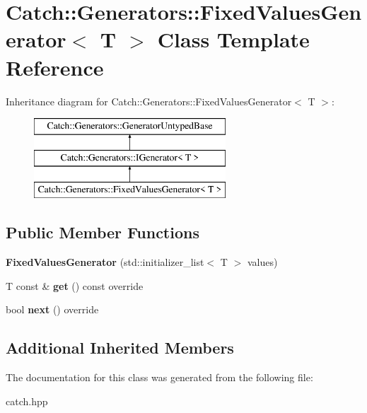 \hypertarget{classCatch_1_1Generators_1_1FixedValuesGenerator}{}\section{Catch\+::Generators\+::Fixed\+Values\+Generator$<$ T $>$ Class Template Reference}
\label{classCatch_1_1Generators_1_1FixedValuesGenerator}
Inheritance diagram for Catch\+::Generators\+::Fixed\+Values\+Generator$<$ T $>$\+:\begin{figure}[H]
\begin{center}
\leavevmode
\includegraphics[height=3.000000cm]{classCatch_1_1Generators_1_1FixedValuesGenerator}
\end{center}
\end{figure}
\subsection*{Public Member Functions}
\begin{DoxyCompactItemize}
\item 
\mbox{\label{classCatch_1_1Generators_1_1FixedValuesGenerator_a6e9f473655413c1cb15f079890f06b86}} 
{\bfseries Fixed\+Values\+Generator} (std\+::initializer\+\_\+list$<$ T $>$ values)
\item 
\mbox{\label{classCatch_1_1Generators_1_1FixedValuesGenerator_ad2ea8c959c600386bcc4b2656b40d33e}} 
T const  \& {\bfseries get} () const override
\item 
\mbox{\label{classCatch_1_1Generators_1_1FixedValuesGenerator_a6ce9e3ed045239c7b82873f24bd9cd3b}} 
bool {\bfseries next} () override
\end{DoxyCompactItemize}
\subsection*{Additional Inherited Members}


The documentation for this class was generated from the following file\+:\begin{DoxyCompactItemize}
\item 
catch.\+hpp\end{DoxyCompactItemize}
